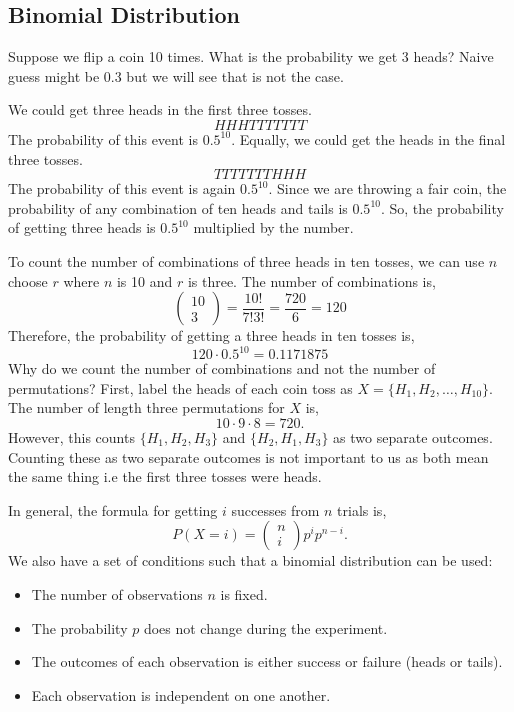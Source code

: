 \documentclass{article}
\begin{document}
\subsection{Binomial Distribution}
Suppose we flip a coin 10 times. What is the probability we get $3$ heads? Naive guess might be 0.3 but we will see that is not the case.

We could get three heads in the first three tosses.
$$
    HHHTTTTTTT
$$
The probability of this event is $0.5 ^ {10}$. Equally, we could get the heads in the final three tosses.
$$
    TTTTTTTHHH
$$
The probability of this event is again $0.5 ^ {10}$. Since we are throwing a fair coin, the probability of any combination of ten heads and tails is $0.5 ^ {10}$. So, the probability of getting three heads is $0.5 ^ {10}$ multiplied by the number.

To count the number of combinations of three heads in ten tosses, we can use $n$ choose $r$ where $n$ is 10 and $r$ is three. The number of combinations is,
$$
    \begin{pmatrix}10 \\ 3\end{pmatrix} = \frac{10!}{7!3!} = \frac{720}{6} = 120
$$
Therefore, the probability of getting a three heads in ten tosses is,
$$
    120 \cdot 0.5 ^ {10} = 0.1171875
$$
Why do we count the number of combinations and not the number of permutations? First, label the heads of each coin toss as $X = \{ H_1, H_2, \dots, H_{10} \}$. The number of length three permutations for $X$ is,
$$
    10 \cdot 9 \cdot 8 = 720.
$$
However, this counts $\{ H_1, H_2, H_3 \}$ and $\{ H_2, H_1, H_3 \}$ as two separate outcomes. Counting these as two separate outcomes is not important to us as both mean the same thing i.e the first three tosses were heads.

In general, the formula for getting $i$ successes from $n$ trials is,
$$
    P(X = i) = \begin{pmatrix} n \\ i \end{pmatrix} p ^ {i} p ^ {n - i}.
$$
We also have a set of conditions such that a binomial distribution can be used:
\begin{itemize}
    \item The number of observations $n$ is fixed.
    \item The probability $p$ does not change during the experiment.
    \item The outcomes of each observation is either success or failure (heads or tails).
    \item Each observation is independent on one another.
\end{itemize}
\end{document}
